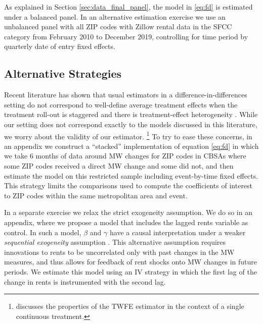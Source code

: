 As explained in Section \ref{sec:data_final_panel}, 
the model in \eqref{eq:fd} is estimated under a balanced panel.
In an alternative estimation exercise we use an unbalanced panel with all 
ZIP codes with Zillow rental data in the SFCC category 
from February 2010 to December 2019, controlling for time period by 
quarterly date of entry fixed effects.

\subsection{Alternative Strategies}\label{sec:alt_emp_strategies}

Recent literature has shown that usual estimators in a difference-in-differences 
setting do not correspond to well-define average treatment effects when the 
treatment roll-out is staggered and there is treatment-effect heterogeneity 
\parencite{deChaisemartinEtAl2022,RothEtAl2022}.
While our setting does not correspond exactly to the models discussed in this
literature, we worry about the validity of our estimator.%
\footnote{\textcite[][Section 3.4]{CallawayEtAl2021} discusses the properties 
of the TWFE estimator in the context of a single continuous treatment.}
To try to ease these concerns, in an appendix we construct a ``stacked'' 
implementation of equation \eqref{eq:fd} in which we take 6 months of data 
around MW changes for ZIP codes in CBSAs where some ZIP codes received a direct 
MW change and some did not, 
and then estimate the model on this restricted sample including event-by-time 
fixed effects.
This strategy limits the comparisons used to compute the coefficients of 
interest to ZIP codes within the same metropolitan area and event.

In a separate exercise we relax the strict exogeneity assumption.
We do so in an appendix, where we propose a model that includes the lagged 
rents variable as control.
In such a model, $\beta$ and $\gamma$ have a causal interpretation under a 
weaker \textit{sequential exogeneity} assumption
\parencite{ArellanoBond1991, ArellanoHonore2001}.
This alternative assumption requires innovations to rents to be uncorrelated 
only with past changes in the MW measures, and thus allows for feedback of 
rent shocks onto MW changes in future periods.
We estimate this model using an IV strategy in which the first lag of the change
in rents is instrumented with the second lag.


